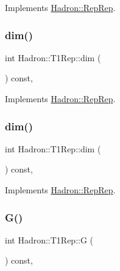 Implements \mbox{\hyperlink{structHadron_1_1RepRep_a92c8802e5ed7afd7da43ccfd5b7cd92b}{Hadron\+::\+Rep\+Rep}}.

\mbox{\label{structHadron_1_1T1Rep_aa5fae2d46d90d11f94ed0b78626e7758}} 
\subsubsection{\texorpdfstring{dim()}{dim()}\hspace{0.1cm}{\footnotesize\ttfamily [4/5]}}
{\footnotesize\ttfamily int Hadron\+::\+T1\+Rep\+::dim (\begin{DoxyParamCaption}{ }\end{DoxyParamCaption}) const\hspace{0.3cm}{\ttfamily [inline]}, {\ttfamily [virtual]}}



Implements \mbox{\hyperlink{structHadron_1_1RepRep_a92c8802e5ed7afd7da43ccfd5b7cd92b}{Hadron\+::\+Rep\+Rep}}.

\mbox{\label{structHadron_1_1T1Rep_aa5fae2d46d90d11f94ed0b78626e7758}} 
\subsubsection{\texorpdfstring{dim()}{dim()}\hspace{0.1cm}{\footnotesize\ttfamily [5/5]}}
{\footnotesize\ttfamily int Hadron\+::\+T1\+Rep\+::dim (\begin{DoxyParamCaption}{ }\end{DoxyParamCaption}) const\hspace{0.3cm}{\ttfamily [inline]}, {\ttfamily [virtual]}}



Implements \mbox{\hyperlink{structHadron_1_1RepRep_a92c8802e5ed7afd7da43ccfd5b7cd92b}{Hadron\+::\+Rep\+Rep}}.

\mbox{\label{structHadron_1_1T1Rep_a824c17669ccaf2513c03a3b41a25108e}} 
\subsubsection{\texorpdfstring{G()}{G()}\hspace{0.1cm}{\footnotesize\ttfamily [1/3]}}
{\footnotesize\ttfamily int Hadron\+::\+T1\+Rep\+::G (\begin{DoxyParamCaption}{ }\end{DoxyParamCaption}) const\hspace{0.3cm}{\ttfamily [inline]}, {\ttfamily [virtual]}}

